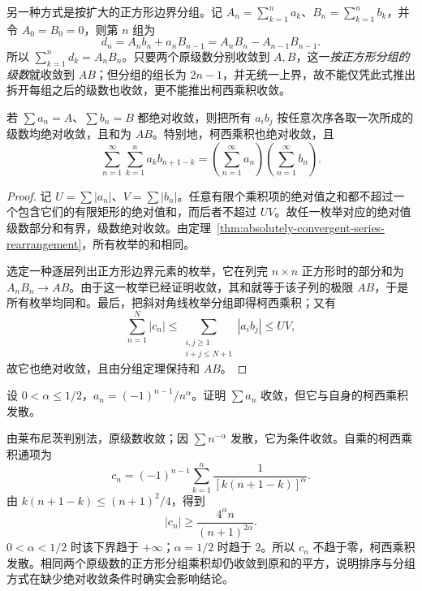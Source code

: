 \documentclass[UTF8,12pt,a4paper,fontset=fandol]{ctexbook}
\begin{document}
另一种方式是按扩大的正方形边界分组。记 $A_n=\sum_{k=1}^n a_k$、$B_n=\sum_{k=1}^n b_k$，并令 $A_0=B_0=0$，则第 $n$ 组为
\[
    d_n=A_nb_n+a_nB_{n-1}=A_nB_n-A_{n-1}B_{n-1}.
\]
所以 $\sum_{k=1}^n d_k=A_nB_n$。只要两个原级数分别收敛到 $A,B$，这一\emph{按正方形分组的级数}就收敛到 $AB$；但分组的组长为 $2n-1$，并无统一上界，故不能仅凭此式推出拆开每组之后的级数也收敛，更不能推出柯西乘积收敛。

\begin{theorem}[绝对收敛级数的乘法]
\label{thm:absolutely-convergent-series-product}
若 $\sum a_n=A$、$\sum b_n=B$ 都绝对收敛，则把所有 $a_ib_j$ 按任意次序各取一次所成的级数均绝对收敛，且和为 $AB$。特别地，柯西乘积也绝对收敛，且
\begin{equation}
    \sum_{n=1}^{\infty}\sum_{k=1}^n a_kb_{n+1-k}
      =\left(\sum_{n=1}^{\infty}a_n\right)
       \left(\sum_{n=1}^{\infty}b_n\right).
    \label{eq:absolute-series-cauchy-product}
\end{equation}
\end{theorem}

\begin{proof}
记 $U=\sum|a_n|$、$V=\sum|b_n|$。任意有限个乘积项的绝对值之和都不超过一个包含它们的有限矩形的绝对值和，而后者不超过 $UV$。故任一枚举对应的绝对值级数部分和有界，级数绝对收敛。由定理~\ref{thm:absolutely-convergent-series-rearrangement}，所有枚举的和相同。

选定一种逐层列出正方形边界元素的枚举，它在列完 $n\times n$ 正方形时的部分和为 $A_nB_n\to AB$。由于这一枚举已经证明收敛，其和就等于该子列的极限 $AB$，于是所有枚举均同和。最后，把斜对角线枚举分组即得柯西乘积；又有
\[
    \sum_{n=1}^N|c_n|
    \leq\sum_{\substack{i,j\geq1\\i+j\leq N+1}}|a_i b_j|
    \leq UV,
\]
故它也绝对收敛，且由分组定理保持和 $AB$。
\end{proof}

\begin{example}
\label{ex:conditional-series-cauchy-square-divergence}
设 $0<\alpha\leq1/2$，$a_n=(-1)^{n-1}/n^\alpha$。证明 $\sum a_n$ 收敛，但它与自身的柯西乘积发散。
\end{example}

\begin{solve}
由莱布尼茨判别法，原级数收敛；因 $\sum n^{-\alpha}$ 发散，它为条件收敛。自乘的柯西乘积通项为
\[
    c_n=(-1)^{n-1}\sum_{k=1}^n
        \frac1{[k(n+1-k)]^\alpha}.
\]
由 $k(n+1-k)\leq(n+1)^2/4$，得到
\[
    |c_n|\geq\frac{4^\alpha n}{(n+1)^{2\alpha}}.
\]
$0<\alpha<1/2$ 时该下界趋于 $+\infty$；$\alpha=1/2$ 时趋于 $2$。所以 $c_n$ 不趋于零，柯西乘积发散。相同两个原级数的正方形分组乘积却仍收敛到原和的平方，说明排序与分组方式在缺少绝对收敛条件时确实会影响结论。
\end{solve}
\end{document}
